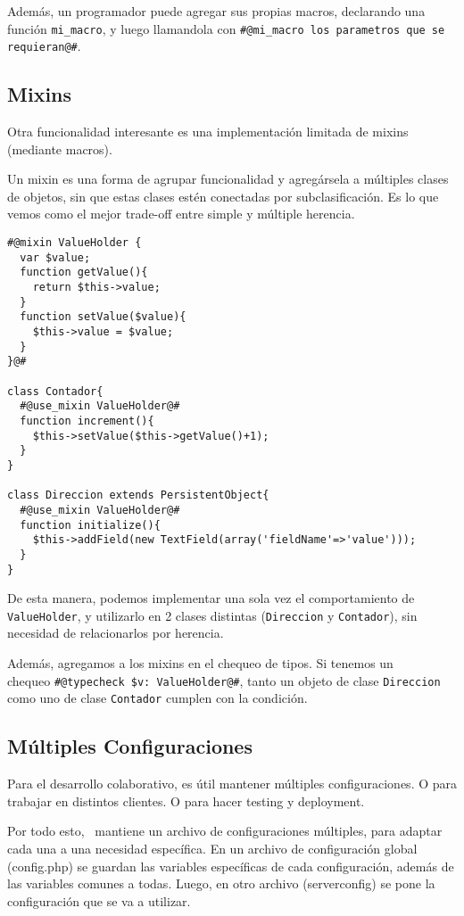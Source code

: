 Además, un programador puede agregar sus propias macros, declarando una función \verb"mi_macro", y luego llamandola con \verb"#@mi_macro los parametros que se requieran@#".

\subsection{Mixins}
\label{sub-mixins}
Otra funcionalidad interesante es una implementación limitada de mixins (mediante macros).

Un mixin es una forma de agrupar funcionalidad y agregársela a múltiples clases de objetos, sin que estas clases estén conectadas por subclasificación. Es lo que vemos como el mejor trade-off entre simple y múltiple herencia.

\begin{verbatim}
#@mixin ValueHolder {
  var $value;
  function getValue(){
    return $this->value;
  }
  function setValue($value){
    $this->value = $value;
  }
}@#

class Contador{
  #@use_mixin ValueHolder@#
  function increment(){
    $this->setValue($this->getValue()+1);
  }
}

class Direccion extends PersistentObject{
  #@use_mixin ValueHolder@#
  function initialize(){
    $this->addField(new TextField(array('fieldName'=>'value')));
  }
}

\end{verbatim}

De esta manera, podemos implementar una sola vez el comportamiento de \verb'ValueHolder', y utilizarlo en 2 clases distintas (\verb"Direccion" y \verb"Contador"), sin necesidad de relacionarlos por herencia.

Además, agregamos a los mixins en el chequeo de tipos. Si tenemos un \\ chequeo \verb"#@typecheck $v: ValueHolder@#", tanto un objeto de clase \verb"Direccion" como uno de clase \verb"Contador" cumplen con la condición.

\subsection{Múltiples Configuraciones}

Para el desarrollo colaborativo, es útil mantener múltiples configuraciones. O para trabajar en distintos clientes. O para hacer testing y deployment.

Por todo esto, \PWB \ mantiene un archivo de configuraciones múltiples, para adaptar cada una a una necesidad específica. En un archivo de configuración global (config.php) se guardan las variables específicas de cada configuración, además de las variables comunes a todas. Luego, en otro archivo (serverconfig) se pone la configuración que se va a utilizar.

